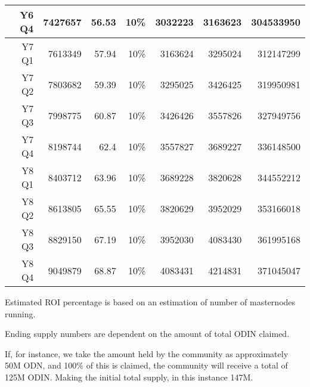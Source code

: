 \begin{center}
\begin{adjustbox}{max width=\textwidth}
\begin{threeparttable}
\begin{tabular}{|rrrrrrr|}
Y6 Q4 & 7427657 & 56.53 & 10\% & 3032223 & 3163623 & 304533950\tabularnewline
\hline
Y7 Q1 & 7613349 & 57.94 & 10\% & 3163624 & 3295024 & 312147299\tabularnewline
\hline
Y7 Q2 & 7803682 & 59.39 & 10\% & 3295025 & 3426425 & 319950981\tabularnewline
\hline
Y7 Q3 & 7998775 & 60.87 & 10\% & 3426426 & 3557826 & 327949756\tabularnewline
\hline
Y7 Q4 & 8198744 & 62.4 & 10\% & 3557827 & 3689227 & 336148500\tabularnewline
\hline
Y8 Q1 & 8403712 & 63.96 & 10\% & 3689228 & 3820628 & 344552212\tabularnewline
\hline
Y8 Q2 & 8613805 & 65.55 & 10\% & 3820629 & 3952029 & 353166018\tabularnewline
\hline
Y8 Q3 & 8829150 & 67.19 & 10\% & 3952030 & 4083430 & 361995168\tabularnewline
\hline
Y8 Q4 & 9049879 & 68.87 & 10\% & 4083431 & 4214831 & 371045047\tabularnewline
\hline
\end{tabular}
\begin{tablenotes}
   \footnotesize 
   \item[\dag] Estimated ROI percentage is based on an estimation of number of masternodes running.
   \item[\dag\dag]Ending supply numbers are dependent on the amount of total ODIN claimed. 
   \normalsize
\end{tablenotes}
\end{threeparttable}
\end{adjustbox}
\end{center}
If, for instance, we take the amount held by the community as approximately 50M ODN, and 100\% of this is claimed, the community will receive a total of 125M ODIN. Making the initial total supply, in this instance 147M. 

